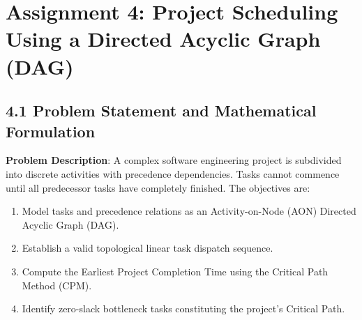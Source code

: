 \documentclass[12pt]{article}
\begin{document}
\section*{Assignment 4: Project Scheduling Using a Directed Acyclic Graph (DAG)}

\subsection*{4.1 Problem Statement and Mathematical Formulation}
\textbf{Problem Description}: A complex software engineering project is subdivided into discrete activities with precedence dependencies. Tasks cannot commence until all predecessor tasks have completely finished. The objectives are:
\begin{enumerate}
    \item Model tasks and precedence relations as an Activity-on-Node (AON) Directed Acyclic Graph (DAG).
    \item Establish a valid topological linear task dispatch sequence.
    \item Compute the Earliest Project Completion Time using the Critical Path Method (CPM).
    \item Identify zero-slack bottleneck tasks constituting the project's Critical Path.
\end{enumerate}
\end{document}
